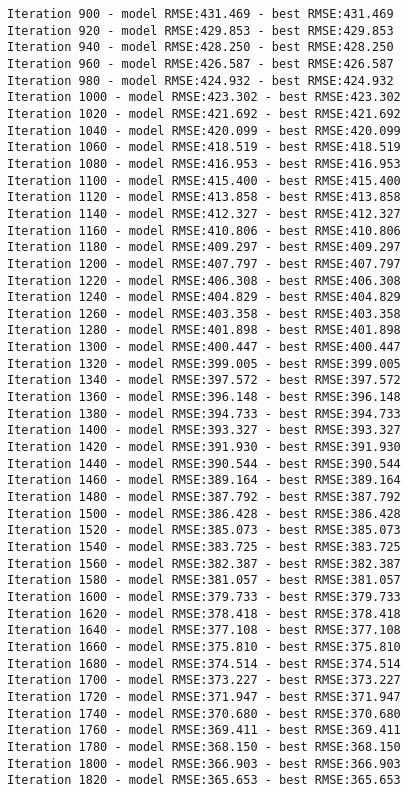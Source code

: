 \documentclass[11pt]{article}
\begin{document}
\begin{Verbatim}[commandchars=\\\{\},fontsize=\small]
Iteration 900 - model RMSE:431.469 - best RMSE:431.469
Iteration 920 - model RMSE:429.853 - best RMSE:429.853
Iteration 940 - model RMSE:428.250 - best RMSE:428.250
Iteration 960 - model RMSE:426.587 - best RMSE:426.587
Iteration 980 - model RMSE:424.932 - best RMSE:424.932
Iteration 1000 - model RMSE:423.302 - best RMSE:423.302
Iteration 1020 - model RMSE:421.692 - best RMSE:421.692
Iteration 1040 - model RMSE:420.099 - best RMSE:420.099
Iteration 1060 - model RMSE:418.519 - best RMSE:418.519
Iteration 1080 - model RMSE:416.953 - best RMSE:416.953
Iteration 1100 - model RMSE:415.400 - best RMSE:415.400
Iteration 1120 - model RMSE:413.858 - best RMSE:413.858
Iteration 1140 - model RMSE:412.327 - best RMSE:412.327
Iteration 1160 - model RMSE:410.806 - best RMSE:410.806
Iteration 1180 - model RMSE:409.297 - best RMSE:409.297
Iteration 1200 - model RMSE:407.797 - best RMSE:407.797
Iteration 1220 - model RMSE:406.308 - best RMSE:406.308
Iteration 1240 - model RMSE:404.829 - best RMSE:404.829
Iteration 1260 - model RMSE:403.358 - best RMSE:403.358
Iteration 1280 - model RMSE:401.898 - best RMSE:401.898
Iteration 1300 - model RMSE:400.447 - best RMSE:400.447
Iteration 1320 - model RMSE:399.005 - best RMSE:399.005
Iteration 1340 - model RMSE:397.572 - best RMSE:397.572
Iteration 1360 - model RMSE:396.148 - best RMSE:396.148
Iteration 1380 - model RMSE:394.733 - best RMSE:394.733
Iteration 1400 - model RMSE:393.327 - best RMSE:393.327
Iteration 1420 - model RMSE:391.930 - best RMSE:391.930
Iteration 1440 - model RMSE:390.544 - best RMSE:390.544
Iteration 1460 - model RMSE:389.164 - best RMSE:389.164
Iteration 1480 - model RMSE:387.792 - best RMSE:387.792
Iteration 1500 - model RMSE:386.428 - best RMSE:386.428
Iteration 1520 - model RMSE:385.073 - best RMSE:385.073
Iteration 1540 - model RMSE:383.725 - best RMSE:383.725
Iteration 1560 - model RMSE:382.387 - best RMSE:382.387
Iteration 1580 - model RMSE:381.057 - best RMSE:381.057
Iteration 1600 - model RMSE:379.733 - best RMSE:379.733
Iteration 1620 - model RMSE:378.418 - best RMSE:378.418
Iteration 1640 - model RMSE:377.108 - best RMSE:377.108
Iteration 1660 - model RMSE:375.810 - best RMSE:375.810
Iteration 1680 - model RMSE:374.514 - best RMSE:374.514
Iteration 1700 - model RMSE:373.227 - best RMSE:373.227
Iteration 1720 - model RMSE:371.947 - best RMSE:371.947
Iteration 1740 - model RMSE:370.680 - best RMSE:370.680
Iteration 1760 - model RMSE:369.411 - best RMSE:369.411
Iteration 1780 - model RMSE:368.150 - best RMSE:368.150
Iteration 1800 - model RMSE:366.903 - best RMSE:366.903
Iteration 1820 - model RMSE:365.653 - best RMSE:365.653

\end{Verbatim}
\end{document}
